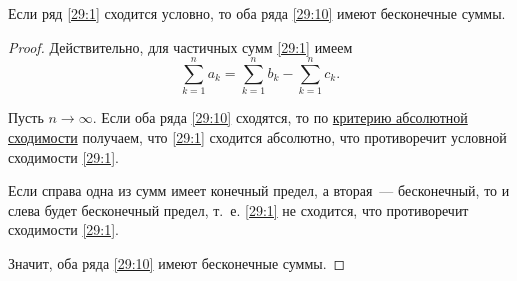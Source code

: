 \documentclass[../../main.tex]{subfiles}
\begin{document}
	\begin{thm}\label{29:conditional_conv}
		Если ряд \eqref{29:1} сходится условно, 
		то оба ряда \eqref{29:10} имеют бесконечные суммы.
	\end{thm}
	\begin{proof}
		Действительно, для частичных сумм \eqref{29:1} имеем 
		\[\sum_{k = 1}^n a_k = \sum_{k = 1}^n b_k - \sum_{k = 1}^n c_k.\]
		
		Пусть $n\to\infty$. Если оба ряда \eqref{29:10} сходятся, 
		то по \hyperref[29:absolute_conv]{критерию абсолютной сходимости} 
		получаем, что \eqref{29:1} сходится абсолютно, что противоречит 
		условной сходимости \eqref{29:1}.
		
		Если справа одна из сумм имеет конечный предел, а вторая~--- бесконечный,
		 то и слева будет бесконечный предел, т.~е. \eqref{29:1} не сходится,
		  что противоречит сходимости \eqref{29:1}.
		
		Значит, оба ряда \eqref{29:10} имеют бесконечные суммы.
	\end{proof}
\end{document}
